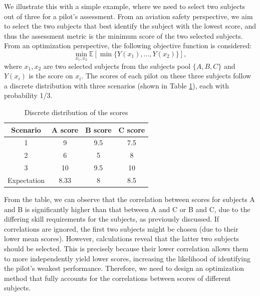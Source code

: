 \documentclass[opre,sglanonrev]{informs4}
\begin{document}
We illustrate this with a simple example, where we need to select two subjects out of three for a pilot's assessment. From an aviation safety perspective, we aim to select the two subjects that best identify the subject with the lowest score, and thus the assessment metric is the minimum score of the two selected subjects. From an optimization perspective, the following objective function is considered:
\begin{equation}
	\min_{x_1,x_2} \mathbb{E}[\min\{Y(x_1),...,Y(x_2) \} ], 
	\label{example}
\end{equation}
where $x_1,x_2$ are two selected subjects from the subjects pool $\{A,B,C\}$ and $Y(x_i)$ is the score on $x_i$. The scores of each pilot on these three subjects follow a discrete distribution with three scenarios (shown in Table \ref{tab:example}), each with probability 1/3.
\begin{table}[ht]
	\centering
	\caption{Discrete distribution of the scores}
	\label{tab:example}
	\begin{tabular}{cccc} 
		Scenario & A score & B score & C score \\ \hline 
		1 & 9 & 9.5 & 7.5\\
		2 & 6 & 5 & 8\\
		3 & 10 & 9.5 & 10\\
		Expectation & 8.33 & 8 & 8.5\\
	\end{tabular}
\end{table}
From the table, we can observe that the correlation between scores for subjects A and B is significantly higher than that between A and C or B and C, due to the differing skill requirements for the subjects, as previously discussed. If correlations are ignored, the first two subjects might be chosen (due to their lower mean scores). However, calculations reveal that the latter two subjects should be selected. This is precisely because their lower correlation allows them to more independently yield lower scores, increasing the likelihood of identifying the pilot’s weakest performance. Therefore, we need to design an optimization method that fully accounts for the correlations between scores of different subjects.
\end{document}
